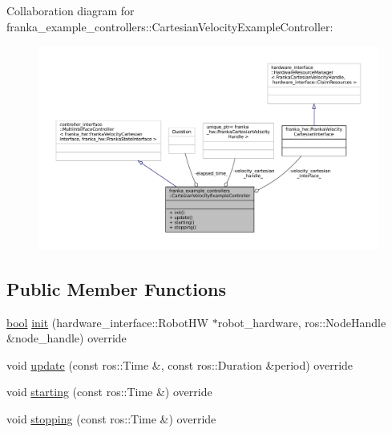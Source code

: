 Collaboration diagram for franka\+\_\+example\+\_\+controllers\+:\+:Cartesian\+Velocity\+Example\+Controller\+:
\nopagebreak
\begin{figure}[H]
\begin{center}
\leavevmode
\includegraphics[width=350pt]{classfranka__example__controllers_1_1CartesianVelocityExampleController__coll__graph}
\end{center}
\end{figure}
\subsection*{Public Member Functions}
\begin{DoxyCompactItemize}
\item 
\hyperlink{classbool}{bool} \hyperlink{classfranka__example__controllers_1_1CartesianVelocityExampleController_a74c17e2afdd736f29e0d165362ddc212}{init} (hardware\+\_\+interface\+::\+Robot\+HW $\ast$robot\+\_\+hardware, ros\+::\+Node\+Handle \&node\+\_\+handle) override
\item 
void \hyperlink{classfranka__example__controllers_1_1CartesianVelocityExampleController_ab39ae92f4a9059066d6f18a6dddeb2b3}{update} (const ros\+::\+Time \&, const ros\+::\+Duration \&period) override
\item 
void \hyperlink{classfranka__example__controllers_1_1CartesianVelocityExampleController_a9326c6506dc721e03447fef88c5c59f7}{starting} (const ros\+::\+Time \&) override
\item 
void \hyperlink{classfranka__example__controllers_1_1CartesianVelocityExampleController_a03ffcb4dd32fa51329f7600384ff22d6}{stopping} (const ros\+::\+Time \&) override
\end{DoxyCompactItemize}

